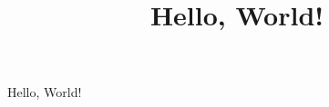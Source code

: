 \documentclass{article}
\begin{document}
\title{Hello, World!}
\author{}
\date{}
\maketitle

Hello, World!
\end{document}
